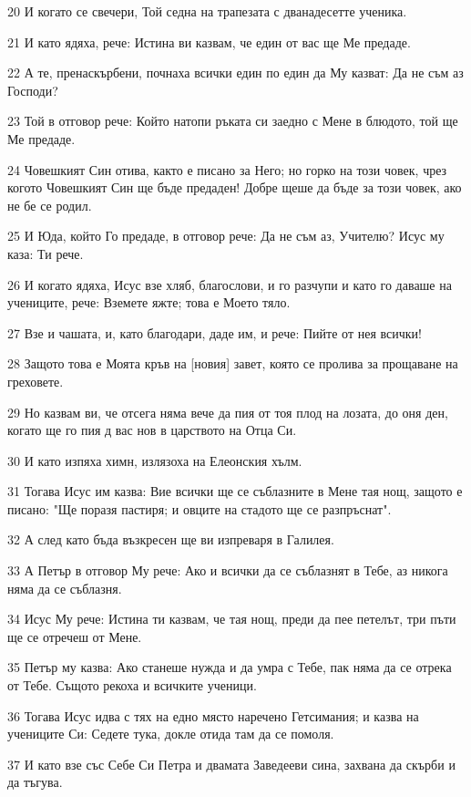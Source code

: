 \par 20 И когато се свечери, Той седна на трапезата с дванадесетте ученика.
\par 21 И като ядяха, рече: Истина ви казвам, че един от вас ще Ме предаде.
\par 22 А те, пренаскърбени, почнаха всички един по един да Му казват: Да не съм аз Господи?
\par 23 Той в отговор рече: Който натопи ръката си заедно с Мене в блюдото, той ще Ме предаде.
\par 24 Човешкият Син отива, както е писано за Него; но горко на този човек, чрез когото Човешкият Син ще бъде предаден! Добре щеше да бъде за този човек, ако не бе се родил.
\par 25 И Юда, който Го предаде, в отговор рече: Да не съм аз, Учителю? Исус му каза: Ти рече.
\par 26 И когато ядяха, Исус взе хляб, благослови, и го разчупи и като го даваше на учениците, рече: Вземете яжте; това е Моето тяло.
\par 27 Взе и чашата, и, като благодари, даде им, и рече: Пийте от нея всички!
\par 28 Защото това е Моята кръв на [новия] завет, която се пролива за прощаване на греховете.
\par 29 Но казвам ви, че отсега няма вече да пия от тоя плод на лозата, до оня ден, когато ще го пия д вас нов в царството на Отца Си.
\par 30 И като изпяха химн, излязоха на Елеонския хълм.
\par 31 Тогава Исус им казва: Вие всички ще се съблазните в Мене тая нощ, защото е писано: "Ще поразя пастиря; и овците на стадото ще се разпръснат".
\par 32 А след като бъда възкресен ще ви изпреваря в Галилея.
\par 33 А Петър в отговор Му рече: Ако и всички да се съблазнят в Тебе, аз никога няма да се съблазня.
\par 34 Исус Му рече: Истина ти казвам, че тая нощ, преди да пее петелът, три пъти ще се отречеш от Мене.
\par 35 Петър му казва: Ако станеше нужда и да умра с Тебе, пак няма да се отрека от Тебе. Същото рекоха и всичките ученици.
\par 36 Тогава Исус идва с тях на едно място наречено Гетсимания; и казва на учениците Си: Седете тука, докле отида там да се помоля.
\par 37 И като взе със Себе Си Петра и двамата Заведееви сина, захвана да скърби и да тъгува.
